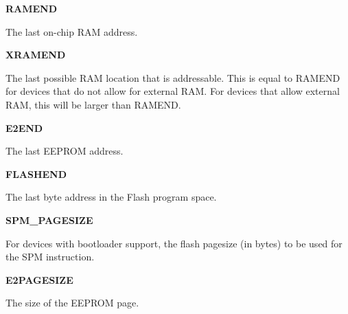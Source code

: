 \begin{DoxyItemize}
\item {\bfseries RAMEND} \par
 The last on-\/chip RAM address. \par

\item {\bfseries XRAMEND} \par
 The last possible RAM location that is addressable. This is equal to RAMEND for devices that do not allow for external RAM. For devices that allow external RAM, this will be larger than RAMEND. \par

\item {\bfseries E2END} \par
 The last EEPROM address. \par

\item {\bfseries FLASHEND} \par
 The last byte address in the Flash program space. \par

\item {\bfseries SPM\_\-PAGESIZE} \par
 For devices with bootloader support, the flash pagesize (in bytes) to be used for the {\ttfamily SPM} instruction.
\item {\bfseries E2PAGESIZE} \par
 The size of the EEPROM page. 
\end{DoxyItemize}
